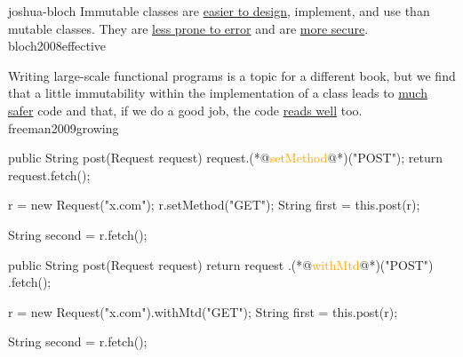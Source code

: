 \documentclass{article}
\begin{document}


\lnQuote
  {joshua-bloch}
  {Immutable classes are \ul{easier to design}, implement, and use than mutable classes. They are \ul{less prone to error} and are \ul{more secure}.}
  {bloch2008effective}

  {Writing large-scale functional programs is a topic for a different book, but we find that a little immutability within the implementation of a class leads to \ul{much safer} code and that, if we do a good job, the code \ul{reads well} too.}
  {freeman2009growing}

\begin{lnSnippet}
public String post(Request request) {
  request.(*@\textcolor{orange}{setMethod}@*)("POST");
  return request.fetch();
}

r = new Request("x.com");
r.setMethod("GET");
String first = this.post(r);

String second = r.fetch();
\end{lnSnippet}
\begin{lnSnippet}
public String post(Request request) {
  return request
    .(*@\textcolor{orange}{withMtd}@*)("POST")
    .fetch();
}

r = new Request("x.com").withMtd("GET");
String first = this.post(r);

String second = r.fetch();
\end{lnSnippet}
\end{document}

